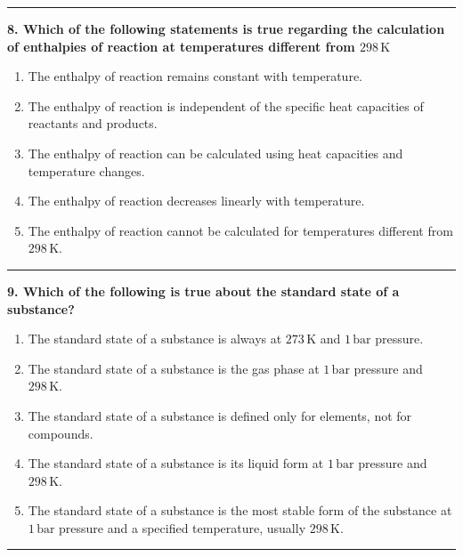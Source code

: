 \documentclass[
  9pt,
]{extbook}
\providecommand{\tightlist}{%
  \setlength{\itemsep}{0pt}\setlength{\parskip}{0pt}}
\theoremstyle{definition}
\theoremstyle{definition}
\theoremstyle{definition}
\theoremstyle{definition}
\theoremstyle{remark}
\begin{document}
\begin{center}\rule{0.5\linewidth}{0.5pt}\end{center}

\textbf{8. Which of the following statements is true regarding the calculation of enthalpies of reaction at temperatures different from \(298\,\text{K}\)}

\begin{enumerate}
\def\labelenumi{\alph{enumi}.}
\tightlist
\item
  The enthalpy of reaction remains constant with temperature.
\item
  The enthalpy of reaction is independent of the specific heat capacities of reactants and products.
\item
  The enthalpy of reaction can be calculated using heat capacities and temperature changes.
\item
  The enthalpy of reaction decreases linearly with temperature.
\item
  The enthalpy of reaction cannot be calculated for temperatures different from \(298\,\text{K}\).
\end{enumerate}

\begin{center}\rule{0.5\linewidth}{0.5pt}\end{center}

\textbf{9. Which of the following is true about the standard state of a substance?}

\begin{enumerate}
\def\labelenumi{\alph{enumi}.}
\tightlist
\item
  The standard state of a substance is always at \(273\,\text{K}\) and \(1\,\text{bar}\) pressure.
\item
  The standard state of a substance is the gas phase at \(1\,\text{bar}\) pressure and \(298 \,\text{K}\).
\item
  The standard state of a substance is defined only for elements, not for compounds.
\item
  The standard state of a substance is its liquid form at \(1\,\text{bar}\) pressure and \(298\,\text{K}\).
\item
  The standard state of a substance is the most stable form of the substance at \(1\,\text{bar}\) pressure and a specified temperature, usually \(298 \,\text{K}\).
\end{enumerate}

\begin{center}\rule{0.5\linewidth}{0.5pt}\end{center}
\end{document}
